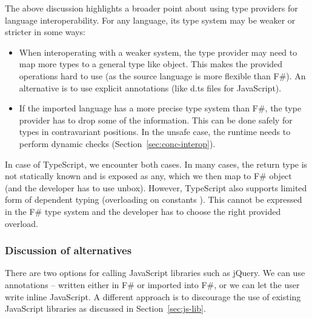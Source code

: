 \documentclass[submission,copyright,creativecommons]{eptcs}
\newcommand{\kvd}[1]{\textnormal{\textcolor{kvdclr}{\sffamily #1}}}
\newcommand{\ident}[1]{\textnormal{\sffamily #1}}
\begin{document}
The above discussion highlights a broader point about using type providers for language
interoperability. For any language, its type system may be weaker or stricter in some ways:

\begin{itemize}
\item When interoperating with a weaker system, the type provider may need
  to map more types to a general type like \ident{object}. This makes the provided operations hard
  to use (as the source language is more flexible than F\#). An alternative is to use explicit
  annotations (like \textcolor{strclr}{\ttfamily d.ts} files for JavaScript).

\item If the imported language has a more precise type system than F\#, the type
  provider has to drop some of the information. This can be done safely for types in
  contravariant positions. In the unsafe case, the runtime needs to perform dynamic checks
  (Section~\ref{sec:conc-interop}).
\end{itemize}

\noindent
In case of TypeScript, we encounter both cases. In many cases, the return type is not
statically known and is exposed as \kvd{any}, which we then map to F\# \ident{object}
(and the developer has to use \ident{unbox}). However, TypeScript also supports limited
form of dependent typing (overloading on constants \cite{ms-typescript-09}). This cannot
be expressed in the F\# type system and the developer has to choose the right provided overload.

\subsubsection{Discussion of alternatives}
There are two options for calling JavaScript libraries such as jQuery. We can use annotations
-- written either in F\# or imported into F\#, or we can let the user write inline JavaScript.
A different approach is to discourage the use of existing JavaScript libraries as discussed in
Section~\ref{sec:js-lib}.
\end{document}
